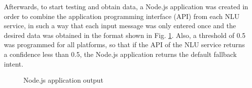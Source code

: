 \documentclass[conference]{IEEEtran}
\begin{document}
Afterwards, to start testing and obtain data, a Node.js application was created in order to combine the application programming interface (API) from each NLU service, in such a way that each input message was only entered once and the desired data was obtained in the format shown in Fig. \ref{fig:nludata}. Also, a threshold of 0.5 was programmed for all platforms, so that if the API of the NLU service returns a confidence less than 0.5, the Node.js application returns the default fallback intent.

\begin{figure}[htbp]
    \centerline{}
    \caption{Node.js application output}
    \label{fig:nludata}
\end{figure}
\end{document}
